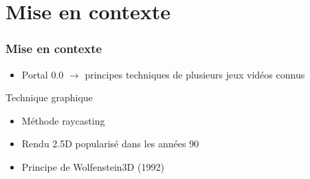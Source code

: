 \documentclass{beamer}
\begin{document}
\section{Mise en contexte}

\begin{frame}
    \frametitle{Mise en contexte}
    \begin{block}{}
        \begin{itemize}
            \item Portal 0.0 $\rightarrow $ principes techniques de plusieurs jeux vidéos connus
        \end{itemize}
    \end{block}

    \begin{block}{Technique graphique}
        \begin{itemize}
            \item Méthode raycasting
            \item Rendu 2.5D popularisé dans les années 90
            \item Principe de Wolfenstein3D (1992)
        \end{itemize}
    \end{block}

\end{frame}
\end{document}
